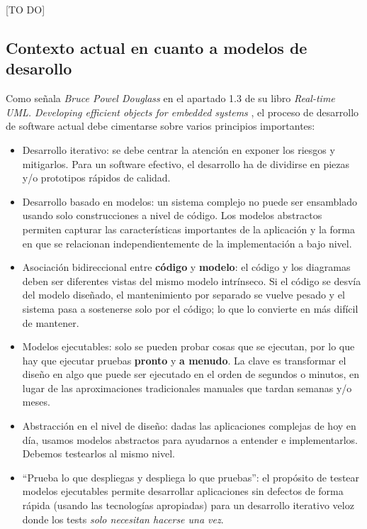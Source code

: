 [TO DO]

\subsection{Contexto actual en cuanto a modelos de desarollo}

Como señala \textit{Bruce Powel Douglass} en el apartado 1.3 de su libro \textit{Real-time UML. Developing efficient objects for embedded systems} \cite{real-time-uml-model-based-development}, el proceso de desarrollo de software actual debe cimentarse sobre varios principios importantes:

\begin{itemize}
	\item Desarrollo iterativo: se debe centrar la atención en exponer los riesgos y mitigarlos. Para un software efectivo, el desarrollo ha de dividirse en piezas y/o prototipos rápidos de calidad.
	\item Desarrollo basado en modelos: un sistema complejo no puede ser ensamblado usando solo construcciones a nivel de código. Los modelos abstractos permiten capturar las características importantes de la aplicación y la forma en que se relacionan independientemente de la implementación a bajo nivel.
	\item Asociación bidireccional entre \textbf{código} y \textbf{modelo}: el código y los diagramas deben ser diferentes vistas del mismo modelo intrínseco. Si el código se desvía del modelo diseñado, el mantenimiento por separado se vuelve pesado y el sistema pasa a sostenerse solo por el código; lo que lo convierte en más difícil de mantener.
	\item Modelos ejecutables: solo se pueden probar cosas que se ejecutan, por lo que hay que ejecutar pruebas \textbf{pronto} y \textbf{a menudo}. La clave es transformar el diseño en algo que puede ser ejecutado en el orden de segundos o minutos, en lugar de las aproximaciones tradicionales manuales que tardan semanas y/o meses.
	\item Abstracción en el nivel de diseño: dadas las aplicaciones complejas de hoy en día, usamos modelos abstractos para ayudarnos a entender e implementarlos. Debemos testearlos al mismo nivel.
	\item ``Prueba lo que despliegas y despliega lo que pruebas'': el propósito de testear modelos ejecutables permite desarrollar aplicaciones sin defectos de forma rápida (usando las tecnologías apropiadas) para un desarrollo iterativo veloz donde los tests \textit{solo necesitan hacerse una vez}.
\end{itemize}

